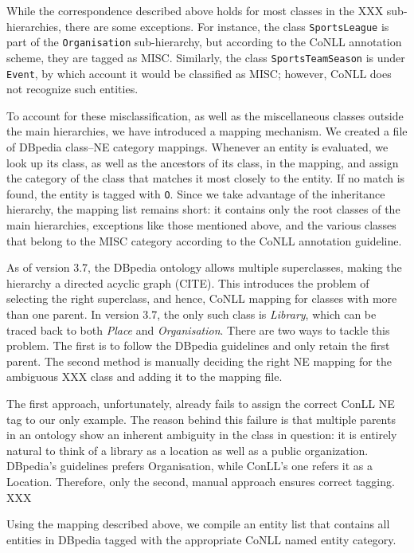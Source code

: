 \documentclass[11pt]{article}
\begin{document}
While the correspondence described above holds for most classes in the XXX sub-hierarchies, there are some exceptions. For instance, the class \texttt{SportsLeague} is part of the \texttt{Organisation} sub-hierarchy, but according to the CoNLL annotation scheme, they are tagged as MISC. Similarly, the class \texttt{SportsTeamSeason} is under \texttt{Event}, by which account it would be classified as MISC; however, CoNLL does not recognize such entities.

To account for these misclassification, as well as the miscellaneous classes outside the main hierarchies, we have introduced a mapping mechanism. We created a file of DBpedia class--NE category mappings. Whenever an entity is evaluated, we look up its class, as well as the ancestors of its class, in the mapping, and assign the category of the class that matches it most closely to the entity. If no match is found, the entity is tagged with \texttt{O}. Since we take advantage of the inheritance hierarchy, the mapping list remains short: it contains only the root classes of the main hierarchies, exceptions like those mentioned above, and the various classes that belong to the MISC category according to the CoNLL annotation guideline.

As of version 3.7, the DBpedia ontology allows multiple superclasses, making the hierarchy a directed acyclic graph (CITE). This introduces the problem of selecting the right superclass, and hence, CoNLL mapping for classes with more than one parent. In version 3.7, the only such class is \textit{Library}, which can be traced back to both \textit{Place} and \textit{Organisation}. There are two ways to tackle this problem. The first is to follow the DBpedia guidelines and only retain the first parent. The second method is manually deciding the right NE mapping for the ambiguous XXX class and adding it to the mapping file.

The first approach, unfortunately, already fails to assign the correct ConLL NE tag to our only example. The reason behind this failure is that multiple parents in an ontology show an inherent ambiguity in the class in question: it is entirely natural to think of a library as a location as well as a public organization. DBpedia's guidelines prefers Organisation, while ConLL's one refers it as a Location. Therefore, only the second, manual approach ensures correct tagging. XXX

%
Using the mapping described above, we compile an entity list that contains all entities in DBpedia tagged with the appropriate CoNLL named entity category.
\end{document}
